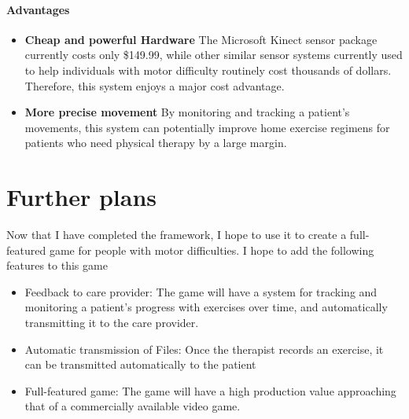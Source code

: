 \documentclass{report}
\begin{document}
\paragraph{Advantages}

\begin{itemize}
	\item \textbf{Cheap and powerful Hardware} The Microsoft Kinect sensor package currently costs only \$149.99, while other similar sensor systems currently used to help individuals with motor difficulty routinely cost thousands of dollars. Therefore, this system enjoys a major cost advantage.

	\item \textbf{More precise movement} By monitoring and tracking a patient's movements, this system can potentially improve home exercise regimens for patients who need physical therapy by a large margin. 
\end{itemize}

\section{Further plans}
Now that I have completed the framework, I hope to use it to create a full-featured game for people with motor difficulties. I hope to add the following features to this game

\begin{itemize}
	\item Feedback to care provider: The game will have a system for tracking and monitoring a patient's progress with exercises over time, and automatically transmitting it to the care provider.

	\item Automatic transmission of Files: Once the therapist records an exercise, it can be transmitted automatically to the patient

	\item Full-featured game: The game will have a high production value approaching that of a commercially available video game.
\end{itemize}
\end{document}
